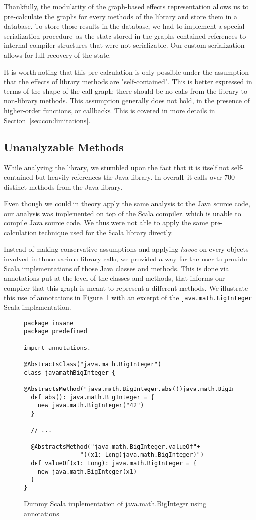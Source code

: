 Thankfully, the modularity of the graph-based effects representation allows us
to pre-calculate the graphs for every methods of the library and store them in
a database. To store those results in the database, we had to implement a
special serialization procedure, as the state stored in the graphs contained
references to internal compiler structures that were not serializable. Our custom
serialization allows for full recovery of the state.

It is worth noting that this pre-calculation is only possible under the
assumption that the effects of library methods are "self-contained". This is better
expressed in terms of the shape of the call-graph: there should be no calls
from the library to non-library methods. This assumption generally does not
hold, in the presence of higher-order functions, or callbacks. This is covered in more
details in Section~\ref{sec:con:limitations}.

\subsection{Unanalyzable Methods}
While analyzing the library, we stumbled upon the fact that it is itself not
self-contained but heavily references the Java library. In overall, it calls
over 700 distinct methods from the Java library.

Even though we could in theory apply the same analysis to the Java source code, our
analysis was implemented on top of the Scala compiler, which is unable to
compile Java source code. We thus were not able to apply the same
pre-calculation technique used for the Scala library directly.

Instead of making conservative assumptions and applying \emph{havoc} on every
objects involved in those various library calls, we provided a way for the user
to provide Scala implementations of those Java classes and methods. This is
done via annotations put at the level of the classes and methods, that
informs our compiler that this graph is meant to represent a different methods.
We illustrate this use of annotations in Figure~\ref{fig:imp:annotations} with
an excerpt of the \lstinline{java.math.BigInteger} Scala implementation.
\begin{figure}[h]
    \centering
\begin{lstlisting}
package insane
package predefined

import annotations._

@AbstractsClass("java.math.BigInteger")
class javamathBigInteger {
  @AbstractsMethod("java.math.BigInteger.abs(()java.math.BigInteger)")
  def abs(): java.math.BigInteger = {
    new java.math.BigInteger("42")
  }

  // ...

  @AbstractsMethod("java.math.BigInteger.valueOf"+
                "((x1: Long)java.math.BigInteger)")
  def valueOf(x1: Long): java.math.BigInteger = {
    new java.math.BigInteger(x1)
  }
}
\end{lstlisting}
    \caption{Dummy Scala implementation of java.math.BigInteger using annotations}
    \label{fig:imp:annotations}
\end{figure}

